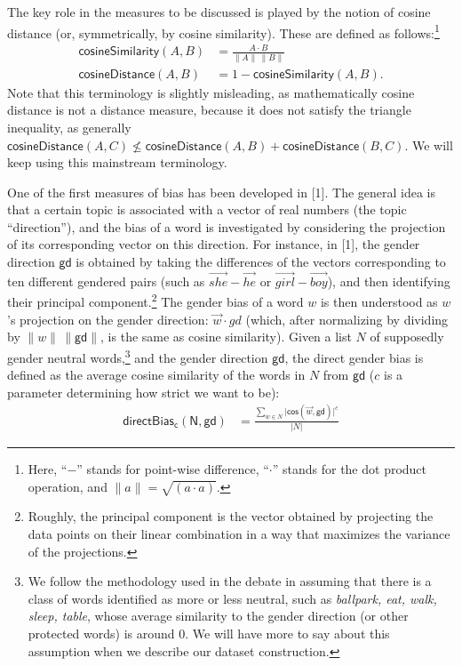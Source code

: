 \documentclass[
  10pt,
  dvipsnames,enabledeprecatedfontcommands]{scrartcl}
\begin{document}
The key role in the measures to be discussed is played by the notion of
cosine distance (or, symmetrically, by cosine similarity). These are
defined as follows:\footnote{Here, ``\(-\)'' stands for point-wise
  difference, ``\(\cdot\)'' stands for the dot product operation, and
  \(\lVert a\rVert = \sqrt{(a \cdot a)}\).} \begin{align} \tag{Sim}
\mathsf{cosineSimilarity}(A,B) & = \frac{A \cdot B}{\lVert  A \rVert \,\lVert B \rVert}
\\
\tag{Distance}
\mathsf{cosineDistance}(A,B) &  = 1 - \mathsf{cosineSimilarity}(A,B).
\end{align} Note that this terminology is slightly misleading, as
mathematically cosine distance is not a distance measure, because it
does not satisfy the triangle inequality, as generally
\(\mathsf{cosineDistance}(A,C) \not \leq \mathsf{cosineDistance}(A,B)+ \mathsf{cosineDistance}(B,C)\).
We will keep using this mainstream terminology.

One of the first measures of bias has been developed in {[}1{]}. The
general idea is that a certain topic is associated with a vector of real
numbers (the topic ``direction''), and the bias of a word is
investigated by considering the projection of its corresponding vector
on this direction. For instance, in {[}1{]}, the gender direction
\(\mathsf{gd}\) is obtained by taking the differences of the vectors
corresponding to ten different gendered pairs (such as
\(\overrightarrow{she} - \overrightarrow{he}\) or
\(\overrightarrow{girl} - \overrightarrow{boy}\)), and then identifying
their principal component.\footnote{Roughly, the principal component is
  the vector obtained by projecting the data points on their linear
  combination in a way that maximizes the variance of the projections.}
The gender bias of a word \(w\) is then understood as \(w\)'s projection
on the gender direction: \(\vec{w} \cdot gd\) (which, after normalizing
by dividing by \(\lVert w \rVert \,\lVert \mathsf{gd} \rVert\), is the
same as cosine similarity). Given a list \(N\) of supposedly gender
neutral words,\footnote{We follow the methodology used in the debate in
  assuming that there is a class of words identified as more or less
  neutral, such as \emph{ballpark, eat, walk, sleep, table}, whose
  average similarity to the gender direction (or other protected words)
  is around 0. We will have more to say about this assumption when we
  describe our dataset construction.} and the gender direction
\(\mathsf{gd}\), the direct gender bias is defined as the average cosine
similarity of the words in \(N\) from \(\mathsf{gd}\) (\(c\) is a
parameter determining how strict we want to be): \begin{align*}
\mathsf{directBias_c(N,gd)} & = \frac{\sum_{w\in N}\vert \mathsf{cos}(\vec{w},\mathsf{gd})\vert^c}{\vert N \vert }
\end{align*} \normalsize 
\end{document}
